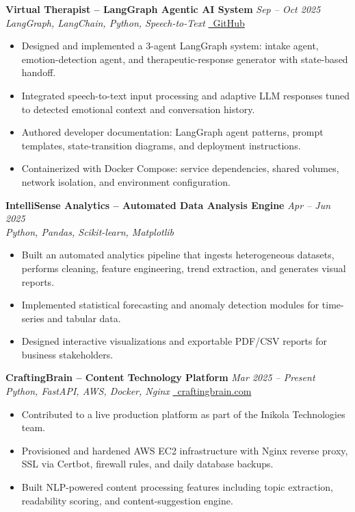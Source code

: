 \documentclass[11pt]{article}
\begin{document}
\textbf{Virtual Therapist -- LangGraph Agentic AI System} \hfill \textit{Sep -- Oct 2025} \\
\textit{LangGraph, LangChain, Python, Speech-to-Text} \hfill \href{https://github.com/JeetInTech/Virtual-Therapist---LangGraph-Agentic-AI-System}{\faGithub\ GitHub}
\begin{itemize}
\item Designed and implemented a 3-agent LangGraph system: intake agent, emotion-detection agent, and therapeutic-response generator with state-based handoff.
\item Integrated speech-to-text input processing and adaptive LLM responses tuned to detected emotional context and conversation history.
\item Authored developer documentation: LangGraph agent patterns, prompt templates, state-transition diagrams, and deployment instructions.
\item Containerized with Docker Compose: service dependencies, shared volumes, network isolation, and environment configuration.
\end{itemize}

\textbf{IntelliSense Analytics -- Automated Data Analysis Engine} \hfill \textit{Apr -- Jun 2025} \\
\textit{Python, Pandas, Scikit-learn, Matplotlib}
\begin{itemize}
\item Built an automated analytics pipeline that ingests heterogeneous datasets, performs cleaning, feature engineering, trend extraction, and generates visual reports.
\item Implemented statistical forecasting and anomaly detection modules for time-series and tabular data.
\item Designed interactive visualizations and exportable PDF/CSV reports for business stakeholders.
\end{itemize}

\textbf{CraftingBrain -- Content Technology Platform} \hfill \textit{Mar 2025 -- Present} \\
\textit{Python, FastAPI, AWS, Docker, Nginx} \hfill \href{https://craftingbrain.com}{\faGlobe\ craftingbrain.com}
\begin{itemize}
\item Contributed to a live production platform as part of the Inikola Technologies team.
\item Provisioned and hardened AWS EC2 infrastructure with Nginx reverse proxy, SSL via Certbot, firewall rules, and daily database backups.
\item Built NLP-powered content processing features including topic extraction, readability scoring, and content-suggestion engine.
\end{itemize}
\end{document}
